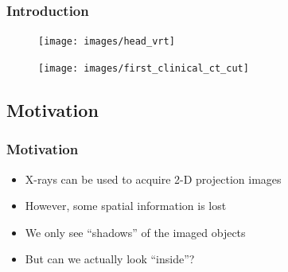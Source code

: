 

\begin{frame}

	\frametitle{Introduction}

	\begin{figure}[tb]
		\centering
		\begin{minipage}{.45\linewidth}
			\centering
			\texttt{[image: images/head\_vrt]}
			\label{fig:ct_intro_1}
		\end{minipage}%
		\begin{minipage}{.45\linewidth}
			\centering
			\texttt{[image: images/first\_clinical\_ct\_cut]}
			\label{fig:ct_hist_1}
		\end{minipage}
	\end{figure}

\end{frame}

\subsection{Motivation}
\label{sub:ct_moti}

\begin{frame}
	\frametitle{Motivation}

	\begin{itemize}
		\item X-rays can be used to acquire 2-D projection images
		\item However, some spatial information is lost
		\item We only see ``shadows'' of the imaged objects
		\item But can we actually look ``inside''?
	\end{itemize}

\end{frame}

